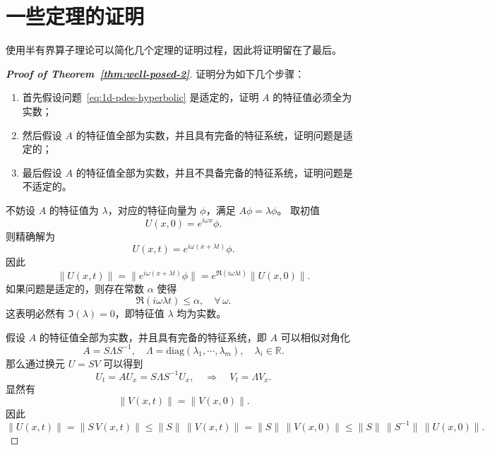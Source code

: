 \section{一些定理的证明} \label{sec:well-posed-proofs}

使用半有界算子理论可以简化几个定理的证明过程，因此将证明留在了最后。

\begin{proof}[\normalfont\bfseries Proof of Theorem~\ref{thm:well-posed-2}]
    证明分为如下几个步骤：
    \begin{enumerate}
        \item 首先假设问题~\eqref{eq:1d-pdes-hyperbolic} 是适定的，证明 $A$ 的特征值必须全为实数；
        \item 然后假设 $A$ 的特征值全部为实数，并且具有完备的特征系统，证明问题是适定的；
        \item 最后假设 $A$ 的特征值全部为实数，并且不具备完备的特征系统，证明问题是不适定的。
    \end{enumerate}

    不妨设 $A$ 的特征值为 $\lambda$，对应的特征向量为 $\phi$，满足 $A \phi = \lambda \phi$。
    取初值
    \[
        U(x,0) = e^{i \omega x} \phi.
    \]
    则精确解为
    \[
        U(x,t) = e^{i \omega (x + \lambda t)} \phi.
    \]
    因此
    \[
        \| U(x,t) \| = \| e^{i \omega (x + \lambda t)} \phi \| = e^{\Re(i \omega \lambda t)} \| U(x,0) \|.
    \]
    如果问题是适定的，则存在常数 $\alpha$ 使得
    \[
        \Re(i \omega \lambda t) \le \alpha,\quad \forall\, \omega.
    \]
    这表明必然有 $\Im(\lambda) = 0$，即特征值 $\lambda$ 均为实数。

    假设 $A$ 的特征值全部为实数，并且具有完备的特征系统，即 $A$ 可以相似对角化
    \[
        A = S \Lambda S^{-1},\quad \Lambda = \text{diag}(\lambda_1, \cdots, \lambda_m),\quad \lambda_i \in \mathbb{R}.
    \]
    那么通过换元 $U = S V$ 可以得到
    \[
        U_t = A U_x = S \Lambda S^{-1} U_x, \quad \Rightarrow \quad V_t = \Lambda V_x.
    \]
    显然有
    \[
        \| V(x,t) \| = \| V(x,0) \|.
    \]
    因此
    \[
        \| U(x,t) \| = \| S\,V(x,t) \| \le \| S \|\,\| V(x,t) \| = \| S \|\,\| V(x,0) \|
        \le  \| S \|\, \| S^{-1} \|\,\| U(x,0) \|.
    \]


\end{proof}
